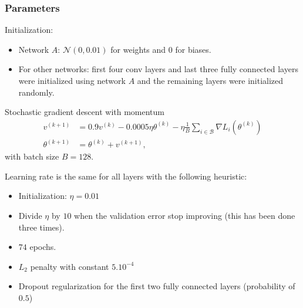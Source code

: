 \begin{frame}
	\frametitle{Parameters}

	Initialization:
	\begin{itemize}
		\item Network $A$: $\mathcal{N}(0, 0.01)$ for weights and $0$ for biases.
		\item For other networks: first four conv layers and last three fully connected layers were initialized using network $A$ and the remaining layers were initialized randomly.
	\end{itemize}




	\begin{block}{Stochastic gradient descent with momentum}
		\begin{align*}
			v^{(k+1)} & = 0.9 v^{(k)} - 0.0005 \eta \theta^{(k)} - \eta \frac{1}{B} \sum_{i \in \mathcal{B}} \nabla L_i (\theta^{(k)})\\
			\theta^{(k+1)} & = \theta^{(k)} + v^{(k+1)},
		\end{align*}
		with batch size $B= 128$.
	\end{block}



	Learning rate is the same for all layers with the following heuristic:
	\begin{itemize}
		\item Initialization: $\eta = 0.01$
		\item Divide $\eta$ by $10$ when the validation error stop improving
		(this has been done three times).
		\item $74$ epochs.
	\end{itemize}

	\begin{itemize}
		\item $L_2$ penalty with constant $5.10^{-4}$
		\item Dropout regularization for the first two fully connected layers (probability of $0.5$)
	\end{itemize}
\end{frame}



